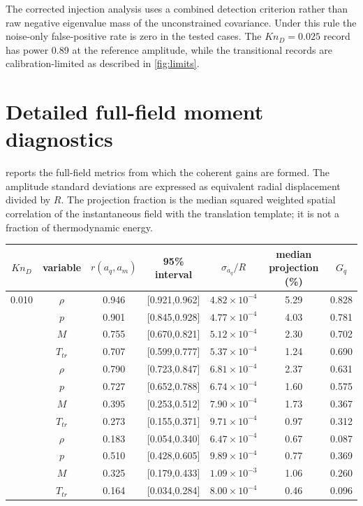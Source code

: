 \documentclass[paper]{JFM-FLM_Au}
\newcommand{\KnD}{Kn_D}
\begin{document}
The corrected injection analysis uses a combined detection criterion rather than raw negative eigenvalue mass of the unconstrained covariance. Under this rule the noise-only false-positive rate is zero in the tested cases. The $\KnD=0.025$ record has power 0.89 at the reference amplitude, while the transitional records are calibration-limited as described in \cref{fig:limits}.

\section{Detailed full-field moment diagnostics}
 reports the full-field metrics from which the coherent gains are formed. The amplitude standard deviations are expressed as equivalent radial displacement divided by $R$. The projection fraction is the median squared weighted spatial correlation of the instantaneous field with the translation template; it is not a fraction of thermodynamic energy.

\begin{center}
\label{tab:fullfielddetail}
\scriptsize
\begin{tabular}{ccccccc}
\toprule
$\KnD$ & variable & $r(a_q,a_m)$ & 95\% interval & $\sigma_{a_q}/R$ & median projection (\%) & $G_q$\\
\midrule
0.010 & $\rho$ & 0.946 & [0.921,0.962] & $4.82\times10^{-4}$ & 5.29 & 0.828\\
      & $p$     & 0.901 & [0.845,0.928] & $4.77\times10^{-4}$ & 4.03 & 0.781\\
      & $M$     & 0.755 & [0.670,0.821] & $5.12\times10^{-4}$ & 2.30 & 0.702\\
      & $T_{tr}$& 0.707 & [0.599,0.777] & $5.37\times10^{-4}$ & 1.24 & 0.690\\
\addlinespace
0.025 & $\rho$ & 0.790 & [0.723,0.847] & $6.81\times10^{-4}$ & 2.37 & 0.631\\
      & $p$     & 0.727 & [0.652,0.788] & $6.74\times10^{-4}$ & 1.60 & 0.575\\
      & $M$     & 0.395 & [0.253,0.512] & $7.90\times10^{-4}$ & 1.73 & 0.367\\
      & $T_{tr}$& 0.273 & [0.155,0.371] & $9.71\times10^{-4}$ & 0.97 & 0.312\\
\addlinespace
0.050 & $\rho$ & 0.183 & [0.054,0.340] & $6.47\times10^{-4}$ & 0.67 & 0.087\\
      & $p$     & 0.510 & [0.428,0.605] & $9.89\times10^{-4}$ & 0.77 & 0.369\\
      & $M$     & 0.325 & [0.179,0.433] & $1.09\times10^{-3}$ & 1.06 & 0.260\\
      & $T_{tr}$& 0.164 & [0.034,0.284] & $8.00\times10^{-4}$ & 0.46 & 0.096\\
\bottomrule
\end{tabular}
\end{center}
\end{document}
